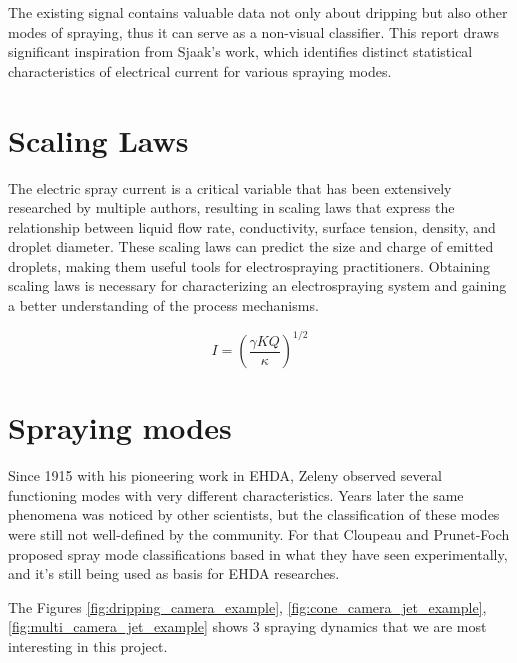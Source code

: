   The existing signal contains valuable data not only about dripping but also other modes of spraying, thus it can serve as a non-visual classifier.
  This report draws significant inspiration from Sjaak's\cite{Sjaaks} work, which identifies distinct statistical characteristics of electrical current for various spraying modes.



\section{Scaling Laws}
\label{sec:scalling-laws}

The electric spray current is a critical variable that has been extensively researched by multiple authors\cite{prunet}\cite{Chen_Pui}\cite{gananCalvo}, resulting in scaling laws that express the relationship between liquid flow rate, conductivity, surface tension, density, and droplet diameter. 
These scaling laws can predict the size and charge of emitted droplets, making them useful tools for electrospraying practitioners. 
Obtaining scaling laws is necessary for characterizing an electrospraying system and gaining a better understanding of the process mechanisms. 

\[ I = (\frac{\gamma K Q}{\kappa})^{1/2}\]

\section{Spraying modes}
\label{sec:spraying_modes_subsec}

Since 1915 with his pioneering work in EHDA, Zeleny\cite{zeleny14} observed several functioning modes with very different characteristics.
Years later the same phenomena was noticed by other scientists, but the classification of these modes were still not well-defined by the community.
For that Cloupeau and Prunet-Foch\cite{prunet} proposed spray mode classifications based in what they have seen experimentally, and it's still being used as basis for EHDA researches.

The Figures \ref{fig:dripping_camera_example}, \ref{fig:cone_camera_jet_example}, \ref{fig:multi_camera_jet_example} shows 3 spraying dynamics that we are most interesting in this project. 

